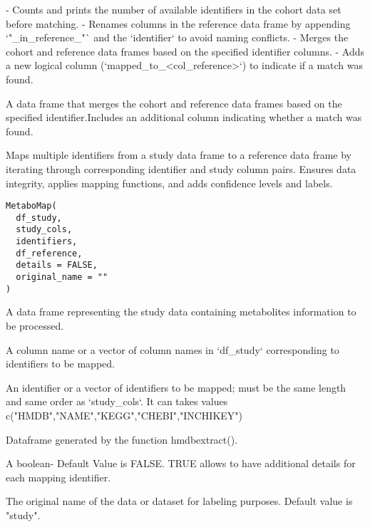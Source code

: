 \documentclass[a4paper]{book}
\begin{document}
%
\begin{Details}
- Counts and prints the number of available identifiers in the cohort data set before matching.
- Renames columns in the reference data frame by appending `"\_in\_reference\_"` and the `identifier`
to avoid naming conflicts.
- Merges the cohort and reference data frames based on the specified identifier columns.
- Adds a new logical column (`mapped\_to\_<col\_reference>`) to indicate if a match was found.
\end{Details}
%
\begin{Value}
A data frame that merges the cohort and reference data frames based on the specified identifier.Includes an additional column indicating whether a match was found.
\end{Value}
%
\begin{Description}
Maps multiple identifiers from a study data frame to a reference data frame by iterating through corresponding identifier and study column pairs. Ensures data integrity, applies mapping functions, and adds confidence levels and labels.
\end{Description}
%
\begin{Usage}
\begin{verbatim}
MetaboMap(
  df_study,
  study_cols,
  identifiers,
  df_reference,
  details = FALSE,
  original_name = ""
)
\end{verbatim}
\end{Usage}
%
\begin{Arguments}
\begin{ldescription}
\item[\code{df\_study}] A data frame representing the study data containing metabolites information to be processed.

\item[\code{study\_cols}] A column name or a vector of column names in `df\_study` corresponding to identifiers to be mapped.

\item[\code{identifiers}] An identifier or a vector of identifiers to be mapped; must be the same length and same order as `study\_cols`. It can takes values c("HMDB","NAME","KEGG","CHEBI","INCHIKEY")

\item[\code{df\_reference}] Dataframe generated by the function hmdbextract().

\item[\code{details}] A boolean- Default Value is FALSE. TRUE allows to have additional details for each mapping identifier.

\item[\code{original\_name}] The original name of the data or dataset for labeling purposes. Default value is "study".
\end{ldescription}
\end{Arguments}
\end{document}

